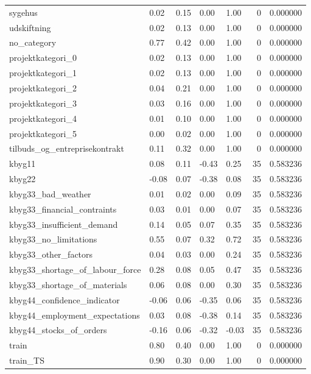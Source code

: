 \begin{landscape}
\begin{longtable}[h!]{lllllrr}
sygehus & 0.02 & 0.15 & 0.00 & 1.00 & 0 & 0.000000 \\
udskiftning & 0.02 & 0.13 & 0.00 & 1.00 & 0 & 0.000000 \\
no_category & 0.77 & 0.42 & 0.00 & 1.00 & 0 & 0.000000 \\
projektkategori_0 & 0.02 & 0.13 & 0.00 & 1.00 & 0 & 0.000000 \\
projektkategori_1 & 0.02 & 0.13 & 0.00 & 1.00 & 0 & 0.000000 \\
projektkategori_2 & 0.04 & 0.21 & 0.00 & 1.00 & 0 & 0.000000 \\
projektkategori_3 & 0.03 & 0.16 & 0.00 & 1.00 & 0 & 0.000000 \\
projektkategori_4 & 0.01 & 0.10 & 0.00 & 1.00 & 0 & 0.000000 \\
projektkategori_5 & 0.00 & 0.02 & 0.00 & 1.00 & 0 & 0.000000 \\
tilbuds_og_entreprisekontrakt & 0.11 & 0.32 & 0.00 & 1.00 & 0 & 0.000000 \\
kbyg11 & 0.08 & 0.11 & -0.43 & 0.25 & 35 & 0.583236 \\
kbyg22 & -0.08 & 0.07 & -0.38 & 0.08 & 35 & 0.583236 \\
kbyg33_bad_weather & 0.01 & 0.02 & 0.00 & 0.09 & 35 & 0.583236 \\
kbyg33_financial_contraints & 0.03 & 0.01 & 0.00 & 0.07 & 35 & 0.583236 \\
kbyg33_insufficient_demand & 0.14 & 0.05 & 0.07 & 0.35 & 35 & 0.583236 \\
kbyg33_no_limitations & 0.55 & 0.07 & 0.32 & 0.72 & 35 & 0.583236 \\
kbyg33_other_factors & 0.04 & 0.03 & 0.00 & 0.24 & 35 & 0.583236 \\
kbyg33_shortage_of_labour_force & 0.28 & 0.08 & 0.05 & 0.47 & 35 & 0.583236 \\
kbyg33_shortage_of_materials & 0.06 & 0.08 & 0.00 & 0.30 & 35 & 0.583236 \\
kbyg44_confidence_indicator & -0.06 & 0.06 & -0.35 & 0.06 & 35 & 0.583236 \\
kbyg44_employment_expectations & 0.03 & 0.08 & -0.38 & 0.14 & 35 & 0.583236 \\
kbyg44_stocks_of_orders & -0.16 & 0.06 & -0.32 & -0.03 & 35 & 0.583236 \\
train & 0.80 & 0.40 & 0.00 & 1.00 & 0 & 0.000000 \\
train_TS & 0.90 & 0.30 & 0.00 & 1.00 & 0 & 0.000000 \\
\end{longtable}\end{landscape}
